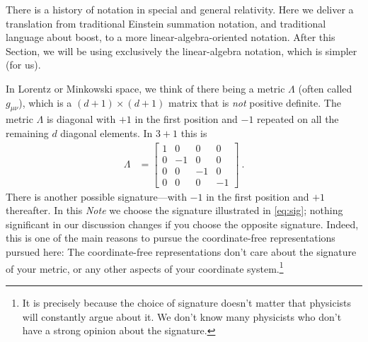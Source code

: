 \documentclass{article}
\newcommand{\plus}{\!+\!} %
\newcommand{\documentname}{\textsl{Note}}
\begin{document}
There is a history of notation in special and general relativity.
Here we deliver a translation from traditional Einstein summation notation, and traditional language about boost, to a more linear-algebra-oriented notation.
After this Section, we will be using exclusively the linear-algebra notation, which is simpler (for us).

In Lorentz or Minkowski space, we think of there being a metric $\Lambda$ (often called $g_{\mu\nu}$), which is a $(d\plus1)\times(d\plus1)$ matrix that is \emph{not} positive definite.
The metric $\Lambda$ is diagonal with $+1$ in the first position and $-1$ repeated on all the remaining $d$ diagonal elements.
In $3\plus1$ this is
\begin{align}\label{eq:sig}
    \Lambda &= \begin{bmatrix}1 & 0 & 0 & 0\\
                              0 & -1 & 0 & 0\\
                              0 & 0 & -1 & 0\\
                              0 & 0 & 0 & -1\end{bmatrix} ~.
\end{align}
There is another possible signature---with $-1$ in the first position and $+1$ thereafter.
In this \documentname{} we choose the signature illustrated in \eqref{eq:sig}; nothing significant in our discussion changes if you choose the opposite signature.
Indeed, this is one of the main reasons to pursue the coordinate-free representations pursued here:
The coordinate-free representations don't care about the signature of your metric, or any other aspects of your coordinate system.\footnote{It is precisely because the choice of signature doesn't matter that physicists will constantly argue about it. We don't know many physicists who don't have a strong opinion about the signature.}
\end{document}
